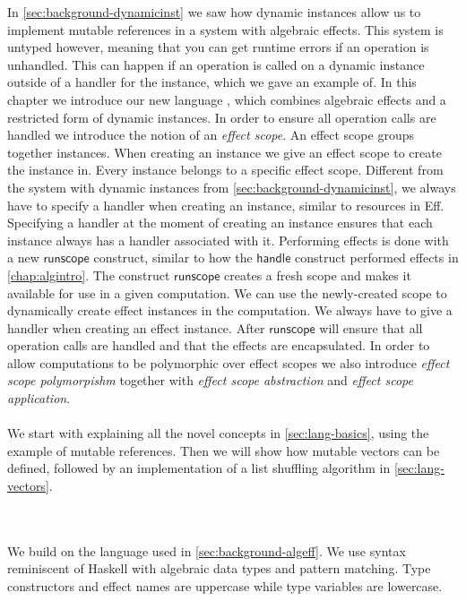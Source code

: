 In \cref{sec:background-dynamicinst} we saw how dynamic instances allow us to implement mutable references in a system with algebraic effects.
This system is untyped however, meaning that you can get runtime errors if an operation is unhandled.
This can happen if an operation is called on a dynamic instance outside of a handler for the instance, which we gave an example of.
In this chapter we introduce our new language \lang{}, which combines algebraic effects and a restricted form of dynamic instances.
In order to ensure all operation calls are handled we introduce the notion of an \emph{effect scope}.
An effect scope groups together instances.
When creating an instance we give an effect scope to create the instance in.
Every instance belongs to a specific effect scope.
Different from the system with dynamic instances from \cref{sec:background-dynamicinst}, we always have to specify a handler when creating an instance, similar to resources in Eff.
Specifying a handler at the moment of creating an instance ensures that each instance always has a handler associated with it.
Performing effects is done with a new $\mathsf{runscope}$ construct, similar to how the $\mathsf{handle}$ construct performed effects in \cref{chap:algintro}.
The construct $\mathsf{runscope}$ creates a fresh scope and makes it available for use in a given computation.
We can use the newly-created scope to dynamically create effect instances in the computation.
We always have to give a handler when creating an effect instance.
After $\mathsf{runscope}$ will ensure that all operation calls are handled and that the effects are encapsulated.
In order to allow computations to be polymorphic over effect scopes we also introduce \emph{effect scope polymorpishm} together with \emph{effect scope abstraction} and \emph{effect scope application}.
\\\\
We start with explaining all the novel concepts in \cref{sec:lang-basics}, using the example of mutable references.
Then we will show how mutable vectors can be defined, followed by an implementation of a list shuffling algorithm in \cref{sec:lang-vectors}.
\iffalse
We end the chapter by showing how our system allows for local effects in Section~3.3.
\fi
\\\\
We build on the language used in \cref{sec:background-algeff}.
We use syntax reminiscent of Haskell with algebraic data types and pattern matching.
Type constructors and effect names are uppercase while type variables are lowercase.

